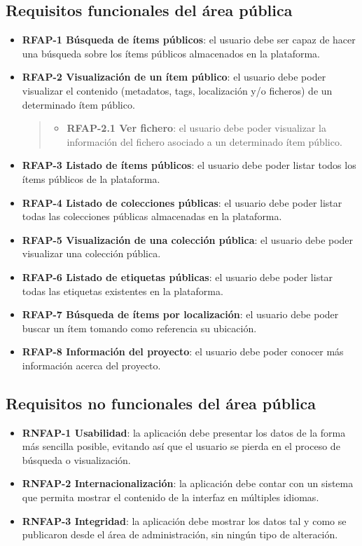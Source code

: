 \subsection{Requisitos funcionales del área pública}

\begin{itemize}
\item
  \textbf{RFAP-1 Búsqueda de ítems públicos}: el usuario debe ser capaz
  de hacer una búsqueda sobre los ítems públicos almacenados en la
  plataforma.
\item
  \textbf{RFAP-2 Visualización de un ítem público}: el usuario debe
  poder visualizar el contenido (metadatos, tags, localización y/o
  ficheros) de un determinado ítem público.

  \begin{quote}
  \begin{itemize}
  \tightlist
  \item
    \textbf{RFAP-2.1 Ver fichero}: el usuario debe poder visualizar la
    información del fichero asociado a un determinado ítem público.
  \end{itemize}
  \end{quote}
\item
  \textbf{RFAP-3 Listado de ítems públicos}: el usuario debe poder
  listar todos los ítems públicos de la plataforma.
\item
  \textbf{RFAP-4 Listado de colecciones públicas}: el usuario debe poder
  listar todas las colecciones públicas almacenadas en la plataforma.
\item
  \textbf{RFAP-5 Visualización de una colección pública}: el usuario
  debe poder visualizar una colección pública.
\item
  \textbf{RFAP-6 Listado de etiquetas públicas}: el usuario debe poder
  listar todas las etiquetas existentes en la plataforma.
\item
  \textbf{RFAP-7 Búsqueda de ítems por localización}: el usuario debe
  poder buscar un ítem tomando como referencia su ubicación.
\item
  \textbf{RFAP-8 Información del proyecto}: el usuario debe poder
  conocer más información acerca del proyecto.
\end{itemize}


\subsection{Requisitos no funcionales del área pública}

\begin{itemize}
\tightlist
\item
  \textbf{RNFAP-1 Usabilidad}: la aplicación debe presentar los datos de
  la forma más sencilla posible, evitando así que el usuario se pierda
  en el proceso de búsqueda o visualización.
\item
  \textbf{RNFAP-2 Internacionalización}: la aplicación debe contar con
  un sistema que permita mostrar el contenido de la interfaz en
  múltiples idiomas.
\item
  \textbf{RNFAP-3 Integridad}: la aplicación debe mostrar los datos tal
  y como se publicaron desde el área de administración, sin ningún tipo
  de alteración.
\end{itemize}

